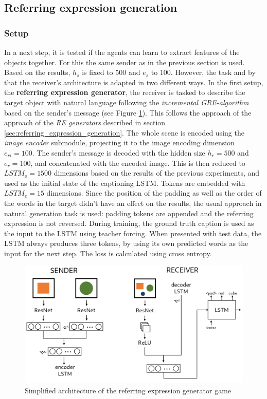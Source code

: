 \subsection{Referring expression generation}
\label{sec:referring-expression-generation-game}
\subsubsection*{Setup}

In a next step, it is tested if the agents can learn to extract features of the objects together.
For this the same sender as in the previous section is used.
Based on the results, $h_s$ is fixed to $500$ and $e_s$ to $100$.
However, the task and by that the receiver's architecture is adapted in two different ways.
In the first setup, the \textbf{referring expression generator}, the receiver is tasked to describe the target object with natural language following the \emph{incremental GRE-algorithm} based on the sender's message (see Figure \ref{fig:caption_generator_game_architecture}).
This follows the approach of the approach of the \emph{RE generators} described in section \ref{sec:referring_expression_generation}.
The whole scene is encoded using the \emph{image encoder} submodule, projecting it to the image encoding dimension $e_{ri}=100$.
The sender's message is decoded with the hidden size $h_r=500$ and $e_r=100$, and concatenated with the encoded image.
This is then reduced to $LSTM_o=1500$ dimensions based on the results of the previous experiments, and used as the initial state of the captioning LSTM.
Tokens are embedded with $LSTM_e=15$ dimensions.
Since the position of the padding as well as the order of the words in the target didn't have an effect on the results, the usual approach in natural generation task is used: padding tokens are appended and the referring expression is not reversed.
During training, the ground truth caption is used as the input to the LSTM using teacher forcing.
When presented with test data, the LSTM always produces three tokens, by using its own predicted words as the input for the next step.
The loss is calculated using cross entropy.

\begin{figure}[ht]
    \centering
    \includegraphics[width=.7\linewidth]{figures/arch_caption_generator_game.png}
    \caption{Simplified architecture of the referring expression generator game}
    \label{fig:caption_generator_game_architecture}
\end{figure}

